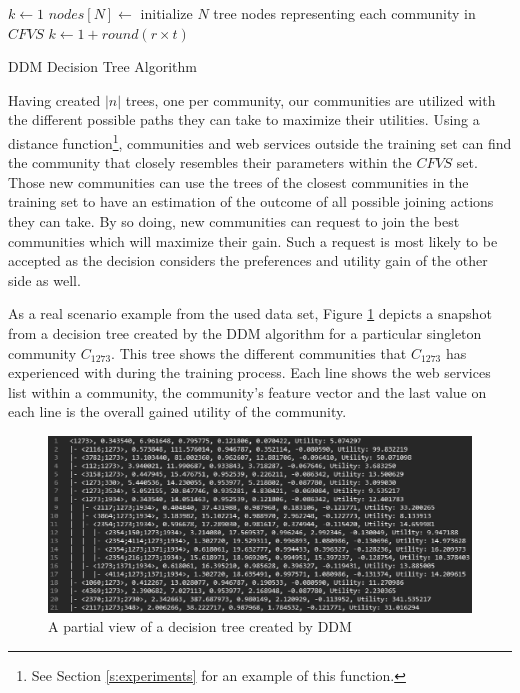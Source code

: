 \documentclass[11pt,onecolumn]{IEEEtran}
\begin{document}
\begin{algorithm}
\DontPrintSemicolon
{}
$k \gets 1$\;
$nodes[N] \gets$ initialize $N$ tree nodes representing each community in $CFVS$\;
 {
	$k \gets 1 + round (r \times t)$\;
   {
	   {
		}
  }
}
\;
\caption{{\sc DDM Decision Tree Algorithm}}
\label{algo:dectree}
\end{algorithm}

Having created $|n|$ trees, one per community, our communities are utilized with the different possible paths they can take to maximize their utilities. Using a distance function\footnote{See Section \ref{s:experiments} for an example of this function.}, communities and web services outside the training set can find the community that closely resembles their parameters within the $CFVS$ set. Those new communities can use the trees of the closest communities in the training set to have an estimation of the outcome of all possible joining actions they can take. By so doing, new communities can request to join the best communities which will maximize their gain. Such a request is most likely to be accepted as the decision considers the preferences and utility gain of the other side as well.

As a real scenario example from the used data set, Figure \ref{fig_tree} depicts a snapshot from a decision tree created by the DDM algorithm for a particular singleton community $C_{1273}$. This tree shows the different communities that $C_{1273}$ has experienced with during the training process. Each line shows the web services list within a community, the community's feature vector and the last value on each line is the overall gained  utility of the community.



\begin{figure}%
\centerline{\includegraphics[width=6.25in]{figures/tree1.eps}}
\caption{A partial view of a decision tree created by DDM}
\label{fig_tree}
\end{figure}
\end{document}
